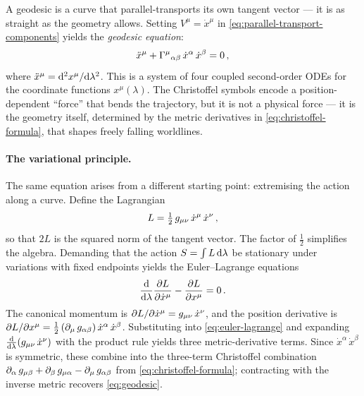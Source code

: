 A geodesic is a curve that parallel-transports its own tangent vector --- it
is as straight as the geometry allows.  Setting $V^\mu = \dot{x}^\mu$ in
\cref{eq:parallel-transport-components} yields the \emph{geodesic equation}:
%
\begin{equation}
  \ddot{x}^\mu + \Gamma^{\mu}{}_{\alpha \beta}\,
  \dot{x}^\alpha\,\dot{x}^\beta = 0 \,,
  \label{eq:geodesic}
\end{equation}
%
where $\ddot{x}^\mu = \mathrm{d}^2 x^\mu / \mathrm{d}\lambda^2$.  This is a system of four
coupled second-order ODEs for the coordinate functions $x^\mu(\lambda)$.  The
Christoffel symbols encode a position-dependent ``force'' that bends the
trajectory, but it is not a physical force --- it is the geometry itself,
determined by the metric derivatives in \cref{eq:christoffel-formula}, that
shapes freely falling worldlines.

\paragraph{The variational principle.}

The same equation arises from a different starting point: extremising the
action along a curve.  Define the Lagrangian
%
\begin{equation}
  L = \tfrac{1}{2}\,g_{\mu\nu}\,\dot{x}^\mu\,\dot{x}^\nu \,,
  \label{eq:geodesic-lagrangian}
\end{equation}
%
so that $2L$ is the squared norm of the tangent vector.  The factor of
$\tfrac{1}{2}$ simplifies the algebra.  Demanding that the action
$S = \int L\,\mathrm{d}\lambda$ be stationary under variations with fixed endpoints
yields the Euler--Lagrange equations
%
\begin{equation}
  \frac{\mathrm{d}}{\mathrm{d}\lambda}\frac{\partial L}{\partial \dot{x}^\mu}
  - \frac{\partial L}{\partial x^\mu} = 0 \,.
  \label{eq:euler-lagrange}
\end{equation}
%
The canonical momentum is
$\partial L / \partial\dot{x}^\mu = g_{\mu\nu}\,\dot{x}^\nu$, and the
position derivative is
$\partial L / \partial x^\mu = \tfrac{1}{2}\,(\partial_{\mu}\,
g_{\alpha\beta})\,\dot{x}^\alpha\,\dot{x}^\beta$.  Substituting into
\cref{eq:euler-lagrange} and expanding
$\tfrac{\mathrm{d}}{\mathrm{d}\lambda}(g_{\mu\nu}\,\dot{x}^\nu)$ with the product rule yields
three metric-derivative terms.  Since $\dot{x}^\alpha\,\dot{x}^\beta$ is
symmetric, these combine into the three-term Christoffel combination
$\partial_{\alpha}\,g_{\mu\beta} + \partial_{\beta}\,g_{\mu\alpha}
- \partial_{\mu}\,g_{\alpha\beta}$ from \cref{eq:christoffel-formula}; contracting
with the inverse metric recovers \cref{eq:geodesic}.

